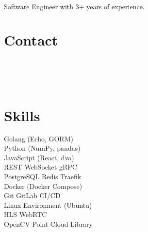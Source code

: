 \documentclass[]{deedy-resume}
\begin{document}
%
%
\lastupdated

%
%
{Software Engineer with 3+ years of experience.}

%
%
\begin{minipage}[t]{0.32\textwidth} 

\section{Contact}
{\parskip3pt
\href{mailto:devcchsu@gmail.com}{}\vspace{3pt} \\
\href{https://www.linkedin.com/in/devcchsu}{}\vspace{3pt} \\
\href{https://github.com/wuchihsu}{}\vspace{3pt} \\
\href{https://goo.gl/maps/CGLqV6QWdAYszMuo9}{}
}
\sectionsep

\section{Skills}
\textbullet{} Golang (Echo, GORM)
\\\textbullet{} Python (NumPy, pandas)
\\\textbullet{} JavaScript (React, dva)
\\\textbullet{} REST \textbullet{} WebSocket \textbullet{} gRPC
\\\textbullet{} PostgreSQL \textbullet{} Redis \textbullet{} Traefik
\\\textbullet{} Docker (Docker Compose)
\\\textbullet{} Git \textbullet{} GitLab CI/CD
\\\textbullet{} Linux Environment (Ubuntu)
\\\textbullet{} HLS \textbullet{} WebRTC
\\\textbullet{} OpenCV \textbullet{} Point Cloud Library
\sectionsep


\end{minipage}
\end{document}
